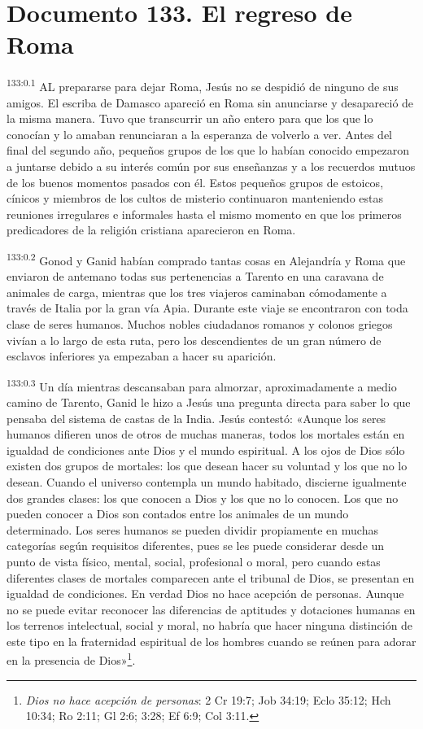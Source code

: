 \chapter{Documento 133. El regreso de Roma}
\par
\textsuperscript{133:0.1} AL prepararse para dejar Roma, Jesús no se despidió de ninguno de sus amigos. El escriba de Damasco apareció en Roma sin anunciarse y desapareció de la misma manera. Tuvo que transcurrir un año entero para que los que lo conocían y lo amaban renunciaran a la esperanza de volverlo a ver. Antes del final del segundo año, pequeños grupos de los que lo habían conocido empezaron a juntarse debido a su interés común por sus enseñanzas y a los recuerdos mutuos de los buenos momentos pasados con él. Estos pequeños grupos de estoicos, cínicos y miembros de los cultos de misterio continuaron manteniendo estas reuniones irregulares e informales hasta el mismo momento en que los primeros predicadores de la religión cristiana aparecieron en Roma.

\par
\textsuperscript{133:0.2} Gonod y Ganid habían comprado tantas cosas en Alejandría y Roma que enviaron de antemano todas sus pertenencias a Tarento en una caravana de animales de carga, mientras que los tres viajeros caminaban cómodamente a través de Italia por la gran vía Apia. Durante este viaje se encontraron con toda clase de seres humanos. Muchos nobles ciudadanos romanos y colonos griegos vivían a lo largo de esta ruta, pero los descendientes de un gran número de esclavos inferiores ya empezaban a hacer su aparición.

\par
\textsuperscript{133:0.3} Un día mientras descansaban para almorzar, aproximadamente a medio camino de Tarento, Ganid le hizo a Jesús una pregunta directa para saber lo que pensaba del sistema de castas de la India. Jesús contestó: «Aunque los seres humanos difieren unos de otros de muchas maneras, todos los mortales están en igualdad de condiciones ante Dios y el mundo espiritual. A los ojos de Dios sólo existen dos grupos de mortales: los que desean hacer su voluntad y los que no lo desean. Cuando el universo contempla un mundo habitado, discierne igualmente dos grandes clases: los que conocen a Dios y los que no lo conocen. Los que no pueden conocer a Dios son contados entre los animales de un mundo determinado. Los seres humanos se pueden dividir propiamente en muchas categorías según requisitos diferentes, pues se les puede considerar desde un punto de vista físico, mental, social, profesional o moral, pero cuando estas diferentes clases de mortales comparecen ante el tribunal de Dios, se presentan en igualdad de condiciones. En verdad Dios no hace acepción de personas. Aunque no se puede evitar reconocer las diferencias de aptitudes y dotaciones humanas en los terrenos intelectual, social y moral, no habría que hacer ninguna distinción de este tipo en la fraternidad espiritual de los hombres cuando se reúnen para adorar en la presencia de Dios»\footnote{\textit{Dios no hace acepción de personas}: 2 Cr 19:7; Job 34:19; Eclo 35:12; Hch 10:34; Ro 2:11; Gl 2:6; 3:28; Ef 6:9; Col 3:11.}.

